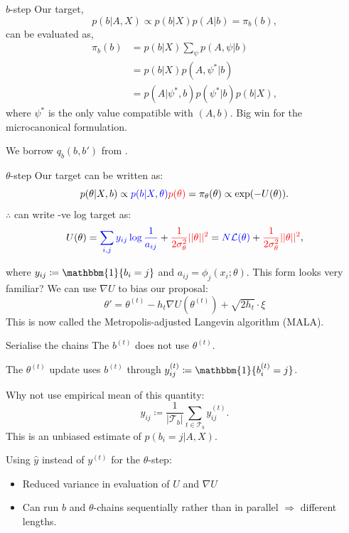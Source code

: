 \documentclass{beamer}
\newcommand{\Lcal}{\mathcal{L}}
\newcommand{\Tcal}{\mathcal{T}}
\newcommand{\one}{\mathbbm{1}}
\begin{document}
	\begin{frame}{$b$-step}
		Our target,
		$$p(b | A, X) \propto p(b | X) p(A | b) = \pi_b(b),$$
		can be evaluated as,
		\begin{align*}
			\pi_b(b) &= p(b|X) \sum_{\psi} p(A, \psi|b) \\
			&= p(b|X) p(A, \psi^* | b) \\
			&= p(A|\psi^*, b) p(\psi^*|b) p(b | X),
		\end{align*}
		where $\psi^*$ is the only value compatible with $(A,b)$. Big win for the microcanonical formulation.
		
		We borrow $q_b(b, b')$ from \citet{Peixoto-Bayesian-Microcanonical}.
	\end{frame}
	
	\begin{frame}{$\theta$-step}
		Our target can be written as:
		$$p(\theta | X, b) \propto
		{\color{blue} p(b |X, \theta)} 
		{\color{red}p(\theta)}
		= \pi_\theta(\theta) \propto \exp(-U(\theta)).$$
		$\therefore$ can write -ve log target as:
		$$U(\theta) 
		= {\color{blue} \sum_{i,j} y_{ij} \log \frac{1}{a_{ij}} } + 
		{\color{red} \frac{1}{2\sigma_\theta^2} || \theta ||^2} 
		= {\color{blue} N \Lcal(\theta)} 
		+ {\color{red} \frac{1}{2\sigma_\theta^2} ||\theta||^2 },$$
		
		where $y_{ij} \coloneqq \one \{b_i = j\}$ and $a_{ij} = \phi_{j}(x_i; \theta)$. This form looks very familiar? We can use $\nabla U$ to bias our proposal:
		$$\theta' = \theta^{(t)} - h_t \nabla U \left(\theta^{(t)} \right) + \sqrt{2h_t} \cdot \xi$$
		This is now called the Metropolis-adjusted Langevin algorithm (MALA).
	\end{frame}
	
	\begin{frame}{Serialise the chains}
		The $b^{(t)}$ does not use $\theta^{(t)}$.
		
		The $\theta^{(t)}$ update uses $b^{(t)}$ through $y^{(t)}_{ij} \coloneqq \one\{b^{(t)}_i = j\}$.
		
		Why not use empirical mean of this quantity:		
		$$\hat{y}_{ij} \coloneqq \frac{1}{|\Tcal_b|} \sum_{t \in \Tcal_b} y_{ij}^{(t)}.$$
		This is an unbiased estimate of $p(b_i=j|A,X)$.
		
		Using $\hat{y}$ instead of $y^{(t)}$ for the $\theta$-step:
		\begin{itemize}
			\item Reduced variance in evaluation of $U$ and $\nabla U$
			\item Can run $b$ and $\theta$-chains sequentially rather than in parallel $\Rightarrow$ different lengths.
		\end{itemize}
	\end{frame}
\end{document}
